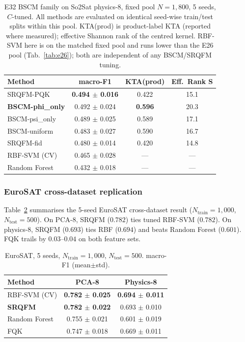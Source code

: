 \documentclass[pdflatex,sn-mathphys-num]{sn-jnl}
\theoremstyle{thmstyleone}
\theoremstyle{thmstyletwo}
\theoremstyle{thmstylethree}
\begin{document}
\begin{table}[htbp]
\caption{E32 BSCM family on So2Sat physics-8, fixed pool $N=1{,}800$,
5 seeds, $C$-tuned. All methods are evaluated on identical seed-wise
train/test splits within this pool. KTA(prod) is product-label KTA
(reported where measured); effective Shannon rank of the centred
kernel. RBF-SVM here is on the matched fixed pool and runs lower than
the E26 pool (Tab.~\ref{tab:e26}); both are independent of any
BSCM/SRQFM tuning.}
\label{tab:bscm-so2sat}
\begin{tabular}{lccc}
\toprule
Method & macro-F1 & KTA(prod) & Eff.\ Rank S \\
\midrule
SRQFM-PQK           & \textbf{0.494 $\pm$ 0.016} & 0.422 & 15.1 \\
\textbf{BSCM-phi\_only} & 0.492 $\pm$ 0.024 & \textbf{0.596} & 20.3 \\
BSCM-psi\_only      & 0.489 $\pm$ 0.025 & 0.589 & 17.1 \\
BSCM-uniform        & 0.483 $\pm$ 0.027 & 0.590 & 16.7 \\
SRQFM-fid           & 0.480 $\pm$ 0.014 & 0.420 & 14.8 \\
RBF-SVM (CV)        & 0.465 $\pm$ 0.028 & ---   & --- \\
Random Forest       & 0.432 $\pm$ 0.018 & ---   & --- \\
\bottomrule
\end{tabular}
\end{table}

\subsubsection{EuroSAT cross-dataset replication}\label{sec:eurosat-cross}
Table~\ref{tab:eurosat-cross} summarises the 5-seed EuroSAT cross-dataset
result ($N_\text{train}=1{,}000$, $N_\text{test}=500$). On
PCA-8, SRQFM ($0.782$) ties tuned RBF-SVM ($0.782$). On physics-8,
SRQFM ($0.693$) ties RBF ($0.694$) and beats Random Forest ($0.601$).
FQK trails by $0.03$--$0.04$ on both feature sets.

\begin{table}[htbp]
\caption{EuroSAT, 5 seeds, $N_\text{train}=1{,}000$,
$N_\text{test}=500$. macro-F1 (mean$\pm$std).}
\label{tab:eurosat-cross}
\begin{tabular}{lcc}
\toprule
Method & PCA-8 & Physics-8 \\
\midrule
RBF-SVM (CV)   & \textbf{0.782 $\pm$ 0.025} & \textbf{0.694 $\pm$ 0.011} \\
\textbf{SRQFM} & \textbf{0.782 $\pm$ 0.022} & 0.693 $\pm$ 0.010 \\
Random Forest  & 0.755 $\pm$ 0.021 & 0.601 $\pm$ 0.019 \\
FQK            & 0.747 $\pm$ 0.018 & 0.669 $\pm$ 0.011 \\
\bottomrule
\end{tabular}
\end{table}
\end{document}
